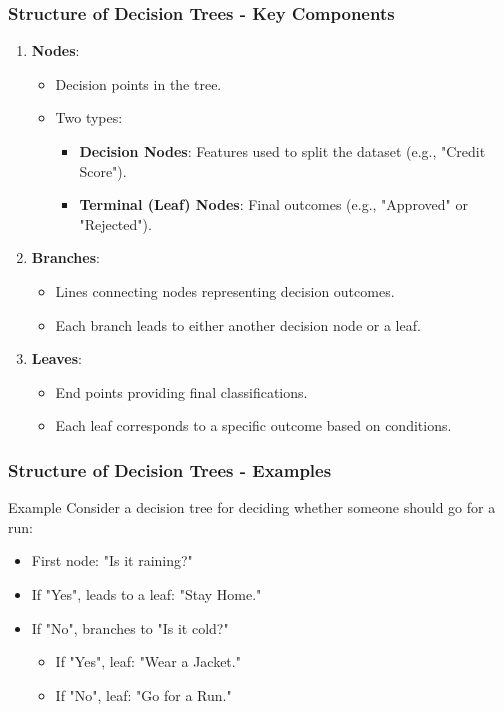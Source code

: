 \documentclass{beamer}
\begin{document}
\begin{frame}[fragile]
    \frametitle{Structure of Decision Trees - Key Components}
    \begin{enumerate}
        \item \textbf{Nodes}:
            \begin{itemize}
                \item Decision points in the tree.
                \item Two types:
                    \begin{itemize}
                        \item \textbf{Decision Nodes}: Features used to split the dataset (e.g., "Credit Score").
                        \item \textbf{Terminal (Leaf) Nodes}: Final outcomes (e.g., "Approved" or "Rejected").
                    \end{itemize}
            \end{itemize}
        \item \textbf{Branches}:
            \begin{itemize}
                \item Lines connecting nodes representing decision outcomes.
                \item Each branch leads to either another decision node or a leaf.
            \end{itemize}
        \item \textbf{Leaves}:
            \begin{itemize}
                \item End points providing final classifications.
                \item Each leaf corresponds to a specific outcome based on conditions.
            \end{itemize}
    \end{enumerate}
\end{frame}

\begin{frame}[fragile]
    \frametitle{Structure of Decision Trees - Examples}
    \begin{block}{Example}
        Consider a decision tree for deciding whether someone should go for a run:
        \begin{itemize}
            \item First node: "Is it raining?"
            \item If "Yes", leads to a leaf: "Stay Home."
            \item If "No", branches to "Is it cold?"
            \begin{itemize}
                \item If "Yes", leaf: "Wear a Jacket."
                \item If "No", leaf: "Go for a Run."
            \end{itemize}
        \end{itemize}
    \end{block}
\end{frame}
\end{document}
